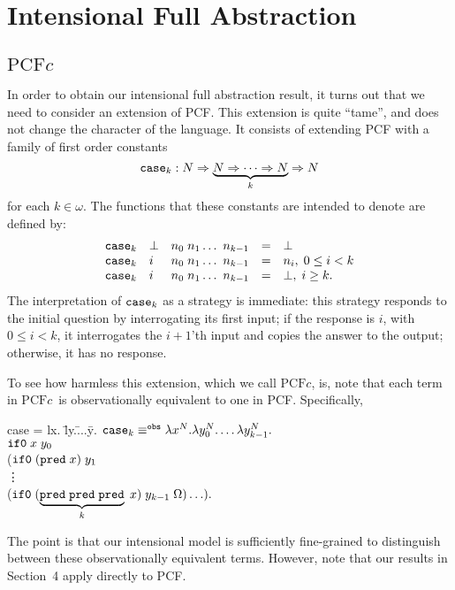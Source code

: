 \documentclass[11pt]{article}
\newcommand{\pcfc}{\mbox{$\mbox{PCF}c$}}
\begin{document}
\section{Intensional Full Abstraction}
\newcommand{\Intmod}{\cal M(I)}

\subsection{\pcfc}

In order to obtain our intensional full abstraction result, it turns out
that we need to consider an extension of PCF. This extension is quite
``tame'', and does not change the character of the language. It consists
of extending PCF with a family of first order constants
\[ {\tt case}_{k} : N \Rightarrow \underbrace{N \Rightarrow \cdots
  \Rightarrow N}_{k} \Rightarrow N \] for each $k \in \omega$.  The
functions that these constants are intended to denote are defined by:
\[ \begin{array}{lllll}
{\tt case}_{k} & \perp & n_0 \; n_1 \ldots\ n_{k-1} &=& \perp \\
{\tt case}_{k} & i     & n_0 \; n_1 \ldots\ n_{k-1} &=& n_i, \; 0 \leq
i < k \\
{\tt case}_{k} & i     & n_0 \; n_1 \ldots\ n_{k-1} &=& \perp, \; i
\geq k .
\end{array}
\]
The interpretation of ${\tt case}_{k}$ as a strategy is immediate:
this strategy responds to the initial question by interrogating its
first input; if the response is $i$, with $ 0 \leq i < k$, it
interrogates the $i+1$'th input and copies the answer to the output;
otherwise, it has no response.

To see how harmless this extension, which we call \pcfc, is, note that
each term in \pcfc\  is observationally equivalent to one in PCF.
Specifically,

\begin{tabbing}
case =  lx. \=ly.\= ...\= y. \kill
${\tt case}_{k} \equiv^{\tt obs} \lambda x^N.  \lambda y_0^N. \ldots
\lambda y_{k-1}^N.$ \\
\> ${\tt if0} \; x \; y_0 $ \\
\> \> (${\tt if0} \; ({\tt pred} \; x) \; y_1 $\\
\>\>\> \vdots \\
\>\>\> (${\tt if0} \; (\underbrace{{\tt pred \; pred \; pred}}_k \; x) \;
y_{k-1} \; \Omega ) \ldots ) .$\\
\end{tabbing}
The point is that our intensional model is sufficiently fine-grained
to distinguish between these observationally equivalent terms.
However, note that our results in Section~4 apply directly to PCF.
\end{document}
